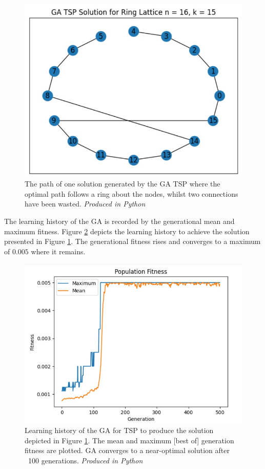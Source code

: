 \documentclass[
	a4paper, %
	10pt, %
	unnumberedsections, %
	twoside, %
]{LTJournalArticle}
\begin{document}
\begin{figure}[H]
	\includegraphics[width=\linewidth]{Figures/tsp/ring_solution.jpg}
	\caption{The path of one solution generated by the GA TSP where the optimal path follows a ring about the nodes, whilst two connections have been wasted. \emph{Produced in Python}}
	\label{fig:ring_solution}
\end{figure}

The learning history of the GA is recorded by the generational mean and maximum fitness. Figure \ref{fig:tsp_history} depicts the learning history to achieve the solution presented in Figure \ref{fig:ring_solution}. The generational fitness rises and converges to a maximum of \(0.005\) where it remains. \\

\begin{figure}[H]
	\includegraphics[width=\linewidth]{Figures/tsp/history.jpg}
	\caption{Learning history of the GA for TSP to produce the solution depicted in Figure \ref{fig:ring_solution}. The mean and maximum [best of] generation fitness are plotted. GA converges to a near-optimal solution after ~100 generations. \emph{Produced in Python}}
	\label{fig:tsp_history}
\end{figure}
\end{document}
